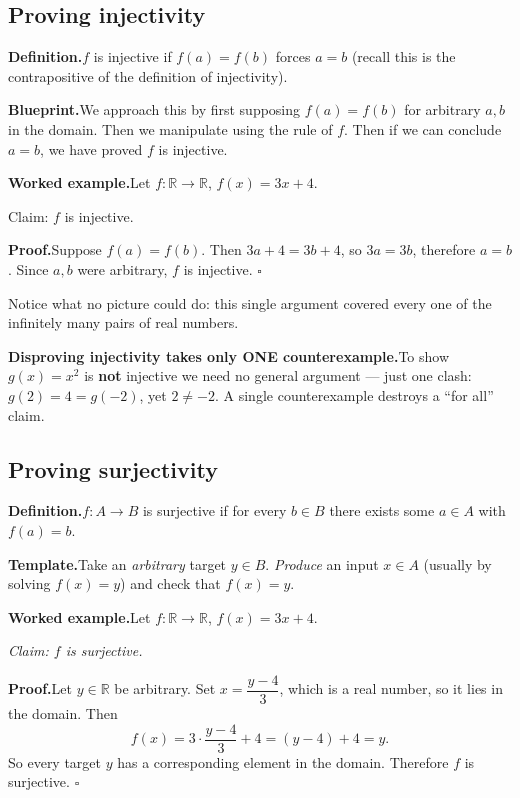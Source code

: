 \documentclass[12pt]{article}
\begin{document}
\subsection*{Proving injectivity}
\textbf{Definition.}\quad $f$ is injective if $f(a) = f(b)$ forces $a = b$ (recall this is the contrapositive of the definition of injectivity).

\textbf{Blueprint.}\quad We approach this by first supposing $f(a) = f(b)$ for arbitrary $a,b$ in the domain. Then we manipulate using the rule of $f$. Then if we can conclude $a = b$, we have proved $f$ is injective.

\medskip
\textbf{Worked example.}\quad Let $f\colon \mathbb{R} \to \mathbb{R}$, $f(x) = 3x + 4$.

Claim: $f$ is injective.

\textbf{Proof.}\quad Suppose $f(a) = f(b)$. Then $3a + 4 = 3b + 4$, so $3a = 3b$, therefore $a = b$. Since $a,b$ were arbitrary, $f$ is injective. $\square$

\medskip
Notice what no picture could do: this single argument covered every one of the infinitely many pairs of real numbers.

\medskip
\textbf{Disproving injectivity takes only ONE counterexample.}\quad To show $g(x) = x^2$ is \textbf{not} injective we need no general argument --- just one clash: $g(2) = 4 = g(-2)$, yet $2 \ne -2$. A single counterexample destroys a ``for all'' claim.

\subsection*{Proving surjectivity}
\textbf{Definition.}\quad $f\colon A \to B$ is surjective if for every $b \in B$ there exists some $a \in A$ with $f(a) = b$.

\textbf{Template.}\quad Take an \textit{arbitrary} target $y \in B$. \textit{Produce} an input $x \in A$ (usually by solving $f(x) = y$) and check that $f(x) = y$.

\medskip
\textbf{Worked example.}\quad Let $f\colon \mathbb{R} \to \mathbb{R}$, $f(x) = 3x + 4$.

\textit{Claim: $f$ is surjective.}

\textbf{Proof.}\quad Let $y \in \mathbb{R}$ be arbitrary. Set $x = \dfrac{y - 4}{3}$, which is a real number, so it lies in the domain. Then
\[
  f(x) = 3 \cdot \frac{y - 4}{3} + 4 = (y - 4) + 4 = y.
\]
So every target $y$ has a corresponding element in the domain. Therefore $f$ is surjective. $\square$
\end{document}
